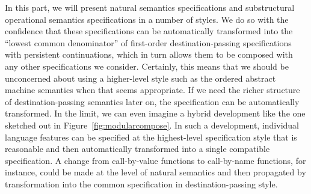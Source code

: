 In this part, we will present natural semantics specifications and
substructural operational semantics specifications in a number of
styles. We do so with the confidence that these specifications can be
automatically transformed into the ``lowest common denominator'' of
first-order destination-passing specifications with persistent
continuations, which in turn allows them to be composed with any other
specifications we consider. Certainly, this means that we should be
unconcerned about using a higher-level style such as the ordered
abstract machine semantics when that seems appropriate. If we need the
richer structure of destination-passing semantics later on, the
specification can be automatically transformed. In the limit, we can
even imagine a hybrid development like the one sketched out in
Figure~\ref{fig:modularcompose}. In such a development, individual
language features can be specified at the highest-level specification
style that is reasonable and then automatically transformed into a
single compatible specification. A change from call-by-value functions
to call-by-name functions, for instance, could be made at the level of
natural semantics and then propagated by transformation into the
common specification in destination-passing style.



